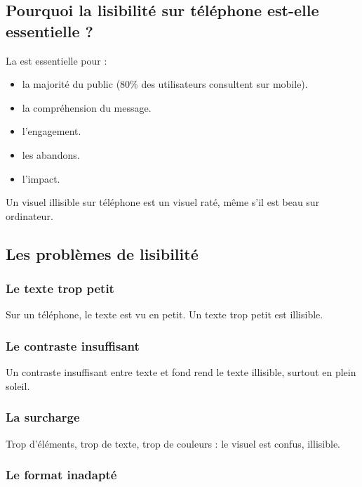 \subsection{Pourquoi la lisibilité sur téléphone est-elle essentielle ?}

La  est essentielle pour :

\begin{itemize}
    \item {} la majorité du public (80\% des utilisateurs consultent sur mobile).
    \item {} la compréhension du message.
    \item {} l'engagement.
    \item {} les abandons.
    \item {} l'impact.
\end{itemize}

Un visuel illisible sur téléphone est un visuel raté, même s'il est beau sur ordinateur.

\subsection{Les problèmes de lisibilité}

\subsubsection{Le texte trop petit}

Sur un téléphone, le texte est vu en petit. Un texte trop petit est illisible.

\subsubsection{Le contraste insuffisant}

Un contraste insuffisant entre texte et fond rend le texte illisible, surtout en plein soleil.

\subsubsection{La surcharge}

Trop d'éléments, trop de texte, trop de couleurs : le visuel est confus, illisible.

\subsubsection{Le format inadapté}

